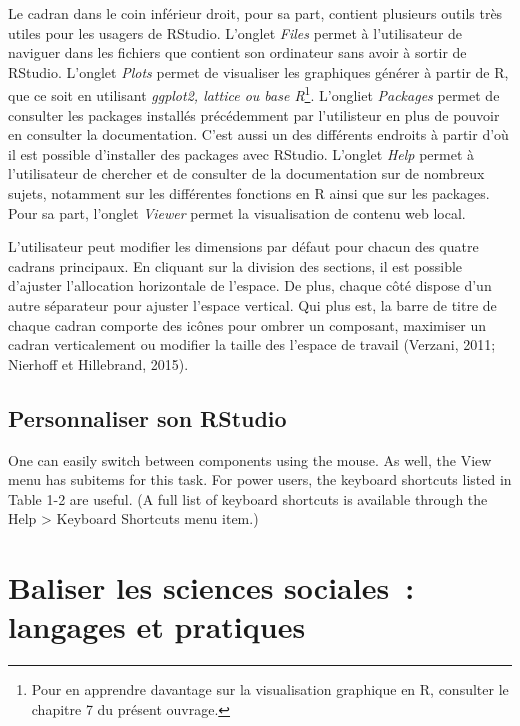 \documentclass[
  letterpaper,
]{scrbook}
\begin{document}
Le cadran dans le coin inférieur droit, pour sa part, contient plusieurs
outils très utiles pour les usagers de RStudio. L'onglet \emph{Files}
permet à l'utilisateur de naviguer dans les fichiers que contient son
ordinateur sans avoir à sortir de RStudio. L'onglet \emph{Plots} permet
de visualiser les graphiques générer à partir de R, que ce soit en
utilisant \emph{ggplot2, lattice ou base R}\footnote{Pour en apprendre
  davantage sur la visualisation graphique en R, consulter le chapitre 7
  du présent ouvrage.}. L'ongliet \emph{Packages} permet de consulter
les packages installés précédemment par l'utilisteur en plus de pouvoir
en consulter la documentation. C'est aussi un des différents endroits à
partir d'où il est possible d'installer des packages avec RStudio.
L'onglet \emph{Help} permet à l'utilisateur de chercher et de consulter
de la documentation sur de nombreux sujets, notamment sur les
différentes fonctions en R ainsi que sur les packages. Pour sa part,
l'onglet \emph{Viewer} permet la visualisation de contenu web local.

L'utilisateur peut modifier les dimensions par défaut pour chacun des
quatre cadrans principaux. En cliquant sur la division des sections, il
est possible d'ajuster l'allocation horizontale de l'espace. De plus,
chaque côté dispose d'un autre séparateur pour ajuster l'espace
vertical. Qui plus est, la barre de titre de chaque cadran comporte des
icônes pour ombrer un composant, maximiser un cadran verticalement ou
modifier la taille des l'espace de travail (Verzani, 2011; Nierhoff et
Hillebrand, 2015).

\hypertarget{personnaliser-son-rstudio}{%
\section{Personnaliser son RStudio}\label{personnaliser-son-rstudio}}

One can easily switch between components using the mouse. As well, the
View menu has subitems for this task. For power users, the keyboard
shortcuts listed in Table 1-2 are useful. (A full list of keyboard
shortcuts is available through the Help \textgreater{} Keyboard
Shortcuts menu item.)


\hypertarget{sec-chap5}{%
\chapter{Baliser les sciences sociales~: langages et
pratiques}\label{sec-chap5}}
\end{document}

